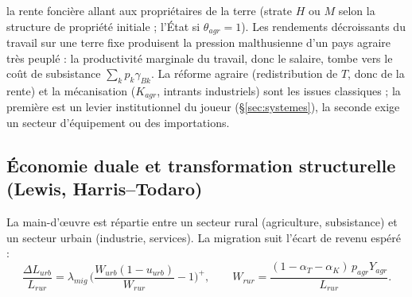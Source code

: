 \documentclass[11pt,a4paper]{article}
\begin{document}
la rente foncière allant aux propriétaires de la terre (strate $H$ ou $M$ selon la structure de propriété initiale ; l'État si $\theta_{agr}=1$).
Les rendements décroissants du travail sur une terre fixe produisent la pression malthusienne d'un pays agraire très peuplé : la productivité marginale du travail, donc le salaire, tombe vers le coût de subsistance $\sum_k p_k \gamma_{Bk}$. La réforme agraire (redistribution de $T$, donc de la rente) et la mécanisation ($K_{agr}$, intrants industriels) sont les issues classiques ; la première est un levier institutionnel du joueur (\S\ref{sec:systemes}), la seconde exige un secteur d'équipement ou des importations.

\subsection{Économie duale et transformation structurelle (Lewis, Harris--Todaro)}
La main-d'œuvre est répartie entre un secteur rural (agriculture, subsistance) et un secteur urbain (industrie, services). La migration suit l'écart de revenu espéré :
\begin{equation}
\frac{\Delta L_{urb}}{L_{rur}} = \lambda_{mig}\,\Big(\frac{W_{urb}(1-u_{urb})}{W_{rur}} - 1\Big)^{+}, \qquad
W_{rur} = \frac{(1-\alpha_T-\alpha_K)\, p_{agr} Y_{agr}}{L_{rur}} .
\label{eq:migr}
\end{equation}
\end{document}
